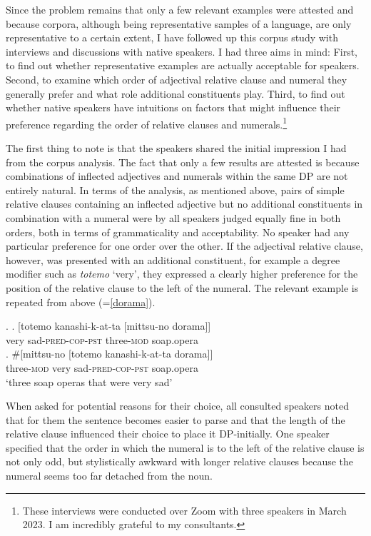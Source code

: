 \documentclass [output=book,colorlinks,citecolor=brown]{langscibook}
\begin{document}
Since the problem remains that only a few relevant examples were attested and because corpora, although being representative samples of a language, are only representative to a certain extent, I have followed up this corpus study with interviews and discussions with native speakers. I had three aims in mind: First, to find out whether representative examples are actually acceptable for speakers. Second, to examine which order of adjectival relative clause and numeral they generally prefer and what role additional constituents play. Third, to find out whether native speakers have intuitions on factors that might influence their preference regarding the order of relative clauses and numerals.\footnote{These interviews were conducted over Zoom with three speakers in March 2023. I am incredibly grateful to my consultants.} %

The first thing to note is that the speakers shared the initial impression I had from the corpus analysis. The fact that only a few results are attested is because combinations of inflected adjectives and numerals within the same DP are not entirely natural. In terms of the analysis, as mentioned above, pairs of simple relative clauses containing an inflected adjective but no additional constituents in combination with a numeral were by all speakers judged equally fine in both orders, both in terms of grammaticality and acceptability. No speaker had any particular preference for one order over the other. If the adjectival relative clause, however, was presented with an additional constituent, for example a degree modifier such as \textit{totemo} `very’, they expressed a clearly higher preference for the position of the relative clause to the left of the numeral. The relevant example is repeated from above (=\ref{dorama}). %

\ex. \ag. [totemo kanashi-k-at-ta [mittsu-no dorama]]\\
very sad-\textsc{pred-cop-pst} three-\textsc{mod} soap.opera\\
\bg. \#[mittsu-no [totemo kanashi-k-at-ta dorama]]\\
three-\textsc{mod} very sad-\textsc{pred-cop-pst} soap.opera\\
`three soap operas that were very sad'

When asked for potential reasons for their choice, all consulted speakers noted that for them the sentence becomes easier to parse and that the length of the relative clause influenced their choice to place it DP-initially. One speaker specified that the order in which the numeral is to the left of the relative clause is not only odd, but stylistically awkward with longer relative clauses because the numeral seems too far detached from the noun.
\end{document}
